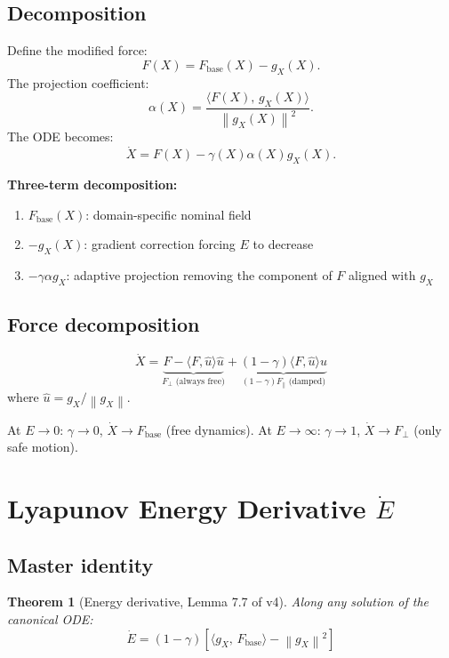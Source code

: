 \documentclass[11pt,a4paper]{article}
\newtheorem{theorem}{Theorem}[section]
\theoremstyle{definition}
\newcommand{\norm}[1]{\left\|#1\right\|}
\newcommand{\inner}[2]{\langle #1,\,#2\rangle}
\newcommand{\Fbase}{F_{\mathrm{base}}}
\newcommand{\gX}{g_X}
\begin{document}
\subsection{Decomposition}

Define the modified force:
\[
F(X) = \Fbase(X) - \gX(X).
\]
The projection coefficient:
\[
\alpha(X) = \frac{\inner{F(X)}{\gX(X)}}{\norm{\gX(X)}^2}.
\]
The ODE becomes:
\[
\dot X = F(X) - \gamma(X)\alpha(X)\gX(X).
\]

\textbf{Three-term decomposition:}
\begin{enumerate}
\item $\Fbase(X)$: domain-specific nominal field
\item $-\gX(X)$: gradient correction forcing $E$ to decrease
\item $-\gamma\alpha\gX$: adaptive projection removing the component of $F$ aligned with $\gX$
\end{enumerate}

\subsection{Force decomposition}

\[
\dot X = \underbrace{F - \langle F,\hat u\rangle\hat u}_{F_\perp \text{ (always free)}}
+ \underbrace{(1-\gamma)\langle F,\hat u\rangle\hat u}_{(1-\gamma)F_\parallel \text{ (damped)}}
\]
where $\hat u = \gX/\norm{\gX}$.

At $E \to 0$: $\gamma \to 0$, $\dot X \to \Fbase$ (free dynamics).
At $E \to \infty$: $\gamma \to 1$, $\dot X \to F_\perp$ (only safe motion).

\section{Lyapunov Energy Derivative $\dot E$}

\subsection{Master identity}

\begin{theorem}[Energy derivative, Lemma 7.7 of v4]
Along any solution of the canonical ODE:
\[
\dot E = (1-\gamma)\left[\inner{\gX}{\Fbase} - \norm{\gX}^2\right]
\]
\end{theorem}
\end{document}
